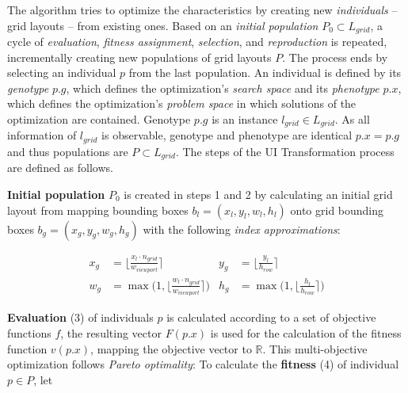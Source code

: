The algorithm tries to optimize the characteristics by creating new \emph{individuals} -- grid layouts -- from existing ones.
Based on an \emph{initial population} \(P_0 \subset L_{grid}\), a cycle of \emph{evaluation}, \emph{fitness assignment}, \emph{selection}, and \emph{reproduction} is repeated, incrementally creating new populations of grid layouts \(P\).
The process ends by selecting an individual \(p\) from the last population.
An individual is defined by its \emph{genotype} \(p\).\(g\), which defines the optimization's \emph{search space} and its \emph{phenotype} \(p\).\(x\), which defines the optimization's \emph{problem space} in which solutions of the optimization are contained.
Genotype \(p.g\) is an instance \(l_{grid} \in L_{grid}\).
As all information of \(l_{grid}\) is observable, genotype and phenotype are identical \(p.x = p.g\) and thus populations are \(P \subset L_{grid}\).
The steps of the UI \gls{Transformation} process are defined as follows.

\textbf{Initial population} \(P_0\) is created in steps 1 and 2 by calculating an initial grid layout from mapping  bounding boxes \(b_l = (x_l, y_l, w_l, h_l)\) onto grid bounding boxes \(b_g = (x_g, y_g, w_g, h_g) \) with the following \emph{index approximations}:

\begin{equation}\label{eq:index-approximations}
\begin{aligned}
x_g &=  \bigg \lfloor \frac{x_l \cdot n_{grid}}{w_{viewport}} \bigg \rceil & y_g &= \bigg \lfloor \frac{y_l}{h_{row}} \bigg \rceil \\
w_g &= \max \bigg (1, \bigg \lfloor \frac{w_l \cdot n_{grid}}{w_{viewport}} \bigg \rceil \bigg ) & h_g &= \max{\bigg (1,   \bigg \lfloor \frac{h_l}{h_{row}} \bigg \rceil \bigg )}
\end{aligned}
\end{equation}

\textbf{Evaluation} (3) of individuals \(p\) is calculated according to a set of objective functions \(f\), the resulting vector \(F(p.x)\) is used for the calculation of the fitness function \(v(p.x)\), mapping the objective vector to \(\mathbb{R}\).
This multi-objective optimization follows \emph{Pareto optimality}: To calculate the \textbf{fitness} (4) of individual \(p \in P\), let

